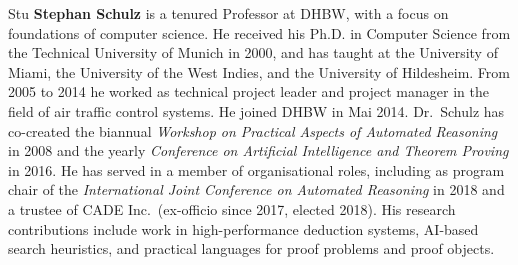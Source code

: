 \begin{sitedescription}{Stu}
\textbf{Stephan Schulz} is a tenured Professor at DHBW, with a focus
on foundations of computer science. He received his Ph.D. in Computer
Science from the Technical University of Munich in 2000, and has
taught at the University of Miami, the University of the West Indies,
and the University of Hildesheim. From 2005 to 2014 he worked as
technical project leader and project manager in the field of air
traffic control systems. He joined DHBW in Mai 2014. Dr.\ Schulz has
co-created the biannual \emph{Workshop on Practical Aspects of
  Automated Reasoning} in 2008 and the yearly \emph{Conference on
  Artificial Intelligence and Theorem Proving} in 2016. He has served
in a member of organisational roles, including as program chair of the
\emph{International Joint Conference on Automated Reasoning} in 2018
and a trustee of CADE Inc.\ (ex-officio since 2017, elected 2018). His
research contributions include work in high-performance deduction
systems, AI-based search heuristics, and practical languages for proof
problems and proof objects.

\end{sitedescription}

